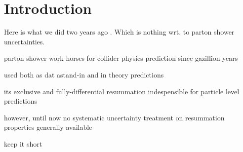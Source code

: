 \section{Introduction}
\label{sec:psunc:intro}

Here is what we did two years ago \cite{AlcarazMaestre:2012vp}. Which is 
nothing wrt. to parton shower uncertainties.

parton shower work horses for collider physics prediction since gazillion years

used both as dat astand-in and in theory predictions

its exclusive and fully-differential resummation 
indespensible for particle level predictions

however, until now no systematic uncertainty treatment on resummation 
properties generally available

keep it short

